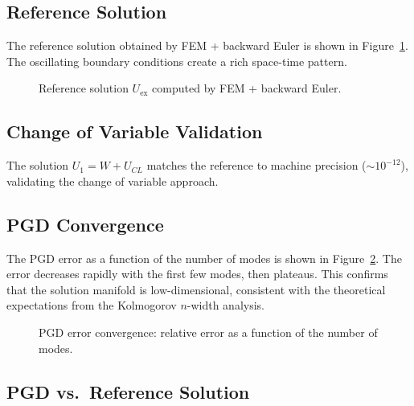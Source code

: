\documentclass[11pt,a4paper]{article}
\begin{document}
\subsection{Reference Solution}

The reference solution obtained by FEM + backward Euler is shown in Figure~\ref{fig:ref}. The oscillating boundary conditions create a rich space-time pattern.

\begin{figure}[H]
    \centering
    \caption{Reference solution $U_{\text{ex}}$ computed by FEM + backward Euler.}
    \label{fig:ref}
\end{figure}

\subsection{Change of Variable Validation}

The solution $U_1 = W + U_{CL}$ matches the reference to machine precision ($\sim 10^{-12}$), validating the change of variable approach.

\subsection{PGD Convergence}

The PGD error as a function of the number of modes is shown in Figure~\ref{fig:pgd_conv}. The error decreases rapidly with the first few modes, then plateaus. This confirms that the solution manifold is low-dimensional, consistent with the theoretical expectations from the Kolmogorov $n$-width analysis.

\begin{figure}[H]
    \centering
    \caption{PGD error convergence: relative error as a function of the number of modes.}
    \label{fig:pgd_conv}
\end{figure}

\subsection{PGD vs.\ Reference Solution}
\end{document}
